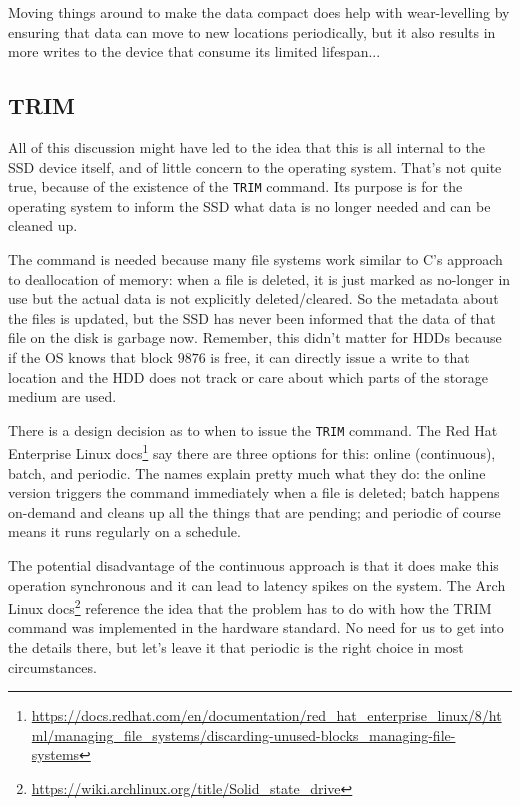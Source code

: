 Moving things around to make the data compact does help with wear-levelling by ensuring that data can move to new locations periodically, but it also results in more writes to the device that consume its limited lifespan...

\subsection*{TRIM}
All of this discussion might have led to the idea that this is all internal to the SSD device itself, and of little concern to the operating system. That's not quite true, because of the existence of the \texttt{TRIM} command. Its purpose is for the operating system to inform the SSD what data is no longer needed and can be cleaned up. 

The command is needed because many file systems work similar to C's approach to deallocation of memory: when a file is deleted, it is just marked as no-longer in use but the actual data is not explicitly deleted/cleared. So the metadata about the files is updated, but the SSD has never been informed that the data of that file on the disk is garbage now. Remember, this didn't matter for HDDs because if the OS knows that block $9876$ is free, it can directly issue a write to that location and the HDD does not track or care about which parts of the storage medium are used.

There is a design decision as to when to issue the \texttt{TRIM} command. The Red Hat Enterprise Linux docs\footnote{ \url{https://docs.redhat.com/en/documentation/red_hat_enterprise_linux/8/html/managing_file_systems/discarding-unused-blocks_managing-file-systems} } say there are three options for this: online (continuous), batch, and periodic. The names explain pretty much what they do: the online version triggers the command immediately when a file is deleted; batch happens on-demand and cleans up all the things that are pending; and periodic of course means it runs regularly on a schedule. 

The potential disadvantage of the continuous approach is that it does make this operation synchronous and it can lead to latency spikes on the system. The Arch Linux docs\footnote{ \url{https://wiki.archlinux.org/title/Solid_state_drive} } reference the idea that the problem has to do with how the TRIM command was implemented in the hardware standard. No need for us to get into the details there, but let's leave it that periodic is the right choice in most circumstances.

